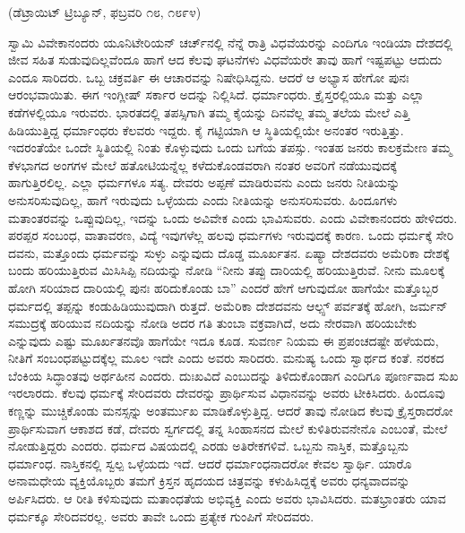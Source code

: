 \delimiter

\begin{center}
(ಡೆಟ್ರಾಯಿಟ್​ ಟ್ರಿಬ್ಯೂನ್​, ಫಬ್ರವರಿ ೧೮, ೧೮೯೪)
\end{center}

ಸ್ವಾಮಿ ವಿವೇಕಾನಂದರು ಯೂನಿಟೇರಿಯನ್​ ಚರ್ಚ್​ನಲ್ಲಿ ನೆನ್ನೆ ರಾತ್ರಿ ವಿಧವೆಯರನ್ನು ಎಂದಿಗೂ ಇಂಡಿಯಾ ದೇಶದಲ್ಲಿ ಜೀವ ಸಹಿತ ಸುಡುವುದಿಲ್ಲವೆಂದೂ ಹಾಗೆ ಆದ ಕೆಲವು ಘಟನೆಗಳು ವಿಧವೆಯರೇ ತಾವು ಹಾಗೆ ಇಷ್ಟಪಟ್ಟು ಆದುದು ಎಂದೂ ಸಾರಿದರು. ಒಬ್ಬ ಚಕ್ರವರ್ತಿ ಈ ಆಚಾರವನ್ನು ನಿಷೇಧಿಸಿದ್ದನು. ಆದರೆ ಆ ಅಭ್ಯಾಸ ಹೇಗೋ ಪುನಃ ಆರಂಭವಾಯಿತು. ಈಗ ಇಂಗ್ಲೀಷ್​ ಸರ್ಕಾರ ಅದನ್ನು ನಿಲ್ಲಿಸಿದೆ. ಧರ್ಮಾಂಧರು. ಕ್ರೈಸ್ತರಲ್ಲಿಯೂ ಮತ್ತು ಎಲ್ಲಾ ಕಡೆಗಳಲ್ಲಿಯೂ ಇರುವರು. ಭಾರತದಲ್ಲಿ ತಪಸ್ಸಿಗಾಗಿ ತಮ್ಮ ಕೈಯನ್ನು ದಿನವೆಲ್ಲ ತಮ್ಮ ತಲೆಯ ಮೇಲೆ ಎತ್ತಿ ಹಿಡಿಯುತ್ತಿದ್ದ ಧರ್ಮಾಂಧರು ಕೆಲವರು ಇದ್ದರು. ಕೈ ಗಟ್ಟಿಯಾಗಿ ಆ ಸ್ಥಿತಿಯಲ್ಲಿಯೇ ಅನಂತರ ಇರುತ್ತಿತ್ತು. ಇದರಂತೆಯೇ ಒಂದೇ ಸ್ಥಿತಿಯಲ್ಲಿ ನಿಂತು ಕೊಳ್ಳುವುದು ಒಂದು ಬಗೆಯ ತಪಸ್ಸು. ಇಂತಹ ಜನರು ಕಾಲಕ್ರಮೇಣ ತಮ್ಮ ಕೆಳಭಾಗದ ಅಂಗಗಳ ಮೇಲೆ ಹತೋಟಿಯನ್ನೆಲ್ಲ ಕಳೆದುಕೊಂಡವರಾಗಿ ನಂತರ ಅವರಿಗೆ ನಡೆಯುವುದಕ್ಕೆ ಹಾಗುತ್ತಿರಲಿಲ್ಲ. ಎಲ್ಲಾ ಧರ್ಮಗಳೂ ಸತ್ಯ. ದೇವರು ಅಪ್ಪಣೆ ಮಾಡಿರುವನು ಎಂದು ಜನರು ನೀತಿಯನ್ನು ಅನುಸರಿಸುವುದಿಲ್ಲ, ಹಾಗೆ ಇರುವುದು ಒಳ್ಳೆಯದು ಎಂದು ನೀತಿಯನ್ನು ಅನುಸರಿಸುವರು. ಹಿಂದೂಗಳು ಮತಾಂತರವನ್ನು ಒಪ್ಪುವುದಿಲ್ಲ, ಇದನ್ನು ಒಂದು ಅವಿವೇಕ ಎಂದು ಭಾವಿಸುವರು. ಎಂದು ವಿವೇಕಾನಂದರು ಹೇಳಿದರು. ಪರಪ್ಪರ ಸಂಬಂಧ, ವಾತಾವರಣ, ವಿದ್ಯೆ ಇವುಗಳೆಲ್ಲ ಹಲವು ಧರ್ಮಗಳು ಇರುವುದಕ್ಕೆ ಕಾರಣ. ಒಂದು ಧರ್ಮಕ್ಕೆ ಸೇರಿ ದವನು, ಮತ್ತೊಂದು ಧರ್ಮವನ್ನು ಸುಳ್ಳು ಎನ್ನುವುದು ದೊಡ್ಡ ಮೂರ್ಖತನ. ಏಷ್ಯಾ ದೇಶದವರು ಅಮೆರಿಕಾ ದೇಶಕ್ಕೆ ಬಂದು ಹರಿಯುತ್ತಿರುವ ಮಿಸಿಸಿಪ್ಪಿ ನದಿಯನ್ನು ನೋಡಿ “ನೀನು ತಪ್ಪು ದಾರಿಯಲ್ಲಿ ಹರಿಯುತ್ತಿರುವೆ. ನೀನು ಮೂಲಕ್ಕೆ ಹೋಗಿ ಸರಿಯಾದ ದಾರಿಯಲ್ಲಿ ಪುನಃ ಹರಿದುಕೊಂಡು ಬಾ” ಎಂದರೆ ಹೇಗೆ ಆಗುವುದೋ ಹಾಗೆಯೇ ಮತ್ತೊಬ್ಬರ ಧರ್ಮದಲ್ಲಿ ತಪ್ಪನ್ನು ಕಂಡುಹಿಡಿಯುವುದಾಗಿ ರುತ್ತದೆ. ಅಮೆರಿಕಾ ದೇಶದವನು ಆಲ್ಪ್ಸ್​ ಪರ್ವತಕ್ಕೆ ಹೋಗಿ, ಜರ್ಮನ್​ ಸಮುದ್ರಕ್ಕೆ ಹರಿಯುವ ನದಿಯನ್ನು ನೋಡಿ ಅದರ ಗತಿ ತುಂಬಾ ವಕ್ರವಾಗಿದೆ, ಅದು ನೇರವಾಗಿ ಹರಿಯಬೇಕು ಎನ್ನುವುದು ಎಷ್ಟು ಮೂರ್ಖತನವೊ ಹಾಗೆಯೇ ಇದೂ ಕೂಡ. ಸುವರ್ಣ ನಿಯಮ ಈ ಪ್ರಪಂಚದಷ್ಟೇ ಹಳೆಯದು, ನೀತಿಗೆ ಸಂಬಂಧಪಟ್ಟುದಕ್ಕೆಲ್ಲ ಮೂಲ ಇದೇ ಎಂದು ಅವರು ಸಾರಿದರು. ಮನುಷ್ಯ ಒಂದು ಸ್ವಾರ್ಥದ ಕಂತೆ. ನರಕದ ಬೆಂಕಿಯ ಸಿದ್ಧಾಂತವು ಅರ್ಥಹೀನ ಎಂದರು. ದುಃಖವಿದೆ ಎಂಬುದನ್ನು ತಿಳಿದುಕೊಂಡಾಗ ಎಂದಿಗೂ ಪೂರ್ಣವಾದ ಸುಖ ಇರಲಾರದು. ಕೆಲವು ಧರ್ಮಕ್ಕೆ ಸೇರಿದವರು ದೇವರನ್ನು ಪ್ರಾರ್ಥಿಸುವ ವಿಧಾನವನ್ನು ಅವರು ಟೀಕಿಸಿದರು. ಹಿಂದೂವು ಕಣ್ಣನ್ನು ಮುಚ್ಚಿಕೊಂಡು ಮನಸ್ಸನ್ನು ಅಂತರ್ಮುಖ ಮಾಡಿಕೊಳ್ಳುತ್ತಿದ್ದ. ಆದರೆ ತಾವು ನೋಡಿದ ಕೆಲವು ಕ್ರೈಸ್ತರಾದರೋ ಪ್ರಾರ್ಥಿಸುವಾಗ ಆಕಾಶದ ಕಡೆ, ದೇವರು ಸ್ವರ್ಗದಲ್ಲಿ ತನ್ನ ಸಿಂಹಾಸನದ ಮೇಲೆ ಕುಳಿತಿರುವನೇನೊ ಎಂಬಂತೆ, ಮೇಲೆ ನೋಡುತ್ತಿದ್ದರು ಎಂದರು. ಧರ್ಮದ ವಿಷಯದಲ್ಲಿ ಎರಡು ಅತಿರೇಕಗಳಿವೆ. ಒಬ್ಬನು ನಾಸ್ತಿಕ, ಮತ್ತೊಬ್ಬನು ಧರ್ಮಾಂಧ. ನಾಸ್ತಿಕನಲ್ಲಿ ಸ್ವಲ್ಪ ಒಳ್ಳೆಯದು ಇದೆ. ಆದರೆ ಧರ್ಮಾಂಧನಾದರೋ ಕೇವಲ ಸ್ವಾರ್ಥಿ. ಯಾರೊ ಅನಾಮಧೇಯ ವ್ಯಕ್ತಿಯೊಬ್ಬರು ತಮಗೆ ಕ್ರಿಸ್ತನ ಹೃದಯದ ಚಿತ್ರವನ್ನು ಕಳುಹಿಸಿದ್ದಕ್ಕೆ ಅವರು ಧನ್ಯವಾದವನ್ನು ಅರ್ಪಿಸಿದರು. ಆ ರೀತಿ ಕಳಿಸುವುದು ಮತಾಂಧತೆಯ ಅಭಿವ್ಯಕ್ತಿ ಎಂದು ಅವರು ಭಾವಿಸಿದರು. ಮತಭ್ರಾಂತರು ಯಾವ ಧರ್ಮಕ್ಕೂ ಸೇರಿದವರಲ್ಲ. ಅವರು ತಾವೇ ಒಂದು ಪ್ರತ್ಯೇಕ ಗುಂಪಿಗೆ ಸೇರಿದವರು.

